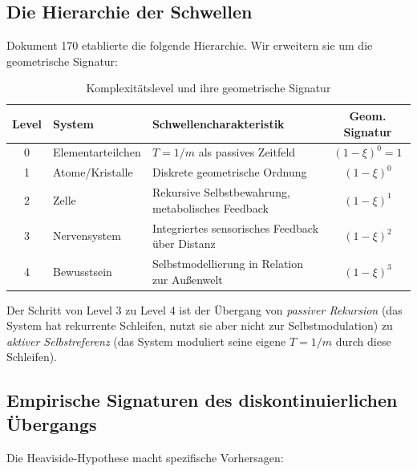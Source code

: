 \documentclass[11pt,a4paper]{article}
\begin{document}
	\subsection{Die Hierarchie der Schwellen}
	
	Dokument 170 etablierte die folgende Hierarchie. Wir erweitern sie um die geometrische Signatur:
	
	\begin{table}[h]
		\centering
		\caption{Komplexitätslevel und ihre geometrische Signatur}
		\begin{tabular}{cllc}
			\toprule
			\textbf{Level} & \textbf{System} & \textbf{Schwellencharakteristik} & \textbf{Geom. Signatur} \\
			\midrule
			0 & Elementarteilchen & \(T = 1/m\) als passives Zeitfeld & \((1-\xi)^0 = 1\) \\
			1 & Atome/Kristalle & Diskrete geometrische Ordnung & \((1-\xi)^0\) \\
			2 & Zelle & Rekursive Selbstbewahrung, metabolisches Feedback & \((1-\xi)^1\) \\
			3 & Nervensystem & Integriertes sensorisches Feedback über Distanz & \((1-\xi)^2\) \\
			4 & Bewusstsein & Selbstmodellierung in Relation zur Außenwelt & \((1-\xi)^3\) \\
			\bottomrule
		\end{tabular}
	\end{table}
	
	\begin{keybox}
		Der Schritt von Level 3 zu Level 4 ist der Übergang von \emph{passiver Rekursion} (das System hat rekurrente Schleifen, nutzt sie aber nicht zur Selbstmodulation) zu \emph{aktiver Selbstreferenz} (das System moduliert seine eigene \(T = 1/m\) durch diese Schleifen).
	\end{keybox}
	
	\subsection{Empirische Signaturen des diskontinuierlichen Übergangs}
	
	Die Heaviside-Hypothese macht spezifische Vorhersagen:
	
\end{document}
